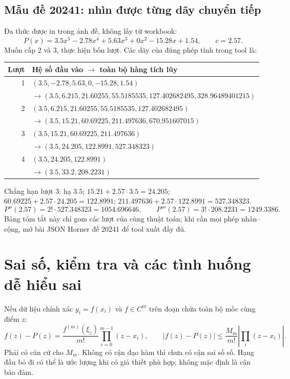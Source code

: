 \subsection{Mẫu đề 20241: nhìn được từng dãy chuyển tiếp}
Đa thức được in trong ảnh đề, không lấy từ workbook:
\[
P(x)=3.5x^5-2.78x^4+5.63x^3+0x^2-15.28x+1.54,\qquad c=2.57.
\]
Muốn cấp 2 và 3, thực hiện bốn lượt. Các dãy của đúng phép tính trong tool là:
\begin{center}\small
\begin{tabular}{@{}rl@{}}\toprule
Lượt & Hệ số đầu vào $\longrightarrow$ toàn bộ hàng tích lũy\\\midrule
1 & $(3.5,-2.78,5.63,0,-15.28,1.54)$\\
 & $\longrightarrow(3.5,6.215,21.60255,55.5185535,127.402682495,328.96489401215)$\\
2 & $(3.5,6.215,21.60255,55.5185535,127.402682495)$\\
 & $\longrightarrow(3.5,15.21,60.69225,211.497636,670.951607015)$\\
3 & $(3.5,15.21,60.69225,211.497636)$\\
 & $\longrightarrow(3.5,24.205,122.8991,527.348323)$\\
4 & $(3.5,24.205,122.8991)$\\
 & $\longrightarrow(3.5,33.2,208.2231)$\\\bottomrule
\end{tabular}\end{center}
Chẳng hạn lượt 3: hạ $3.5$; $15.21+2.57\cdot3.5=24.205$; $60.69225+2.57\cdot24.205=122.8991$; $211.497636+2.57\cdot122.8991=527.348323$.
\[
 \boxed{P''(2.57)=2!\cdot527.348323=1054.696646},\qquad
 \boxed{P'''(2.57)=3!\cdot208.2231=1249.3386}.
\]
Bảng tóm tắt này chỉ gom các lượt của cùng thuật toán; khi cần mọi phép nhân--cộng, mở bài JSON Horner đề 20241 để tool xuất đầy đủ.

\section{Sai số, kiểm tra và các tình huống dễ hiểu sai}
\label{sec:interp-errors}
Nếu dữ liệu chính xác $y_i=f(x_i)$ và $f\in C^m$ trên đoạn chứa toàn bộ mốc cùng điểm $z$:
\[
 f(z)-P(z)=\frac{f^{(m)}(\xi_z)}{m!}\prod_{i=0}^{m-1}(z-x_i),\qquad
 |f(z)-P(z)|\le\frac{M_m}{m!}\left|\prod_i(z-x_i)\right|.
\]
Phải có căn cứ cho $M_m$. Không có cận đạo hàm thì chưa có cận sai số số. Hạng đầu bỏ đi có thể là ước lượng khi có giả thiết phù hợp; không mặc định là cận bảo đảm.

